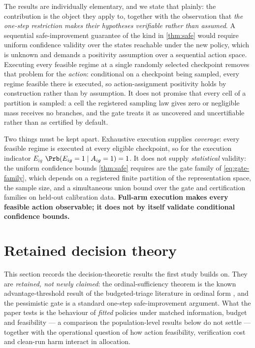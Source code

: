The results are individually elementary, and we state that plainly: the
contribution is the object they apply to, together with the observation that
\emph{the one-step restriction makes their hypotheses verifiable rather than
assumed}.  A sequential safe-improvement guarantee of the kind in
\cref{thm:safe} would require uniform confidence validity over the states
reachable under the new policy, which is unknown and demands a positivity
assumption over a sequential action space.  Executing every feasible regime at a
single randomly selected checkpoint removes that problem for the
\emph{action}: conditional on a checkpoint being sampled, every regime feasible
there is executed, so action-assignment positivity holds by construction rather
than by assumption.  It does not promise that every cell of a partition is
sampled: a cell the registered sampling law gives zero or negligible mass
receives no branches, and the gate treats it as uncovered and uncertifiable
rather than as certified by default.

Two things must be kept apart.  Exhaustive execution supplies
\emph{coverage}: every feasible regime is executed at every eligible checkpoint,
so for the execution indicator $E_{ig}$ $\Prb(E_{ig}=1\mid A_{ig}=1)=1$.  It does
not supply \emph{statistical} validity: the uniform confidence bounds
\cref{thm:safe} requires are the gate family of \cref{eq:gate-family}, which
depends on a registered finite partition of the representation space, the sample
size, and a simultaneous union bound over the gate and certification families on
held-out calibration data.  \textbf{Full-arm execution makes every feasible
action observable; it does not by itself validate conditional confidence
bounds.}
\section{Retained decision theory}
\label{sec:b-theory}

This section records the decision-theoretic results the first study builds on.
They are \emph{retained, not newly claimed}: the ordinal-sufficiency theorem is
the known advantage-threshold result of the budgeted-triage literature in
ordinal form \citep{okati2021,fernandezloria2022,kamran2024}, and the
pessimistic gate is a standard one-step safe-improvement argument.  What the
paper tests is the behaviour of \emph{fitted} policies under matched
information, budget and feasibility --- a comparison the population-level
results below do not settle --- together with the operational question of how
action feasibility, verification cost and clean-run harm interact in
allocation.

